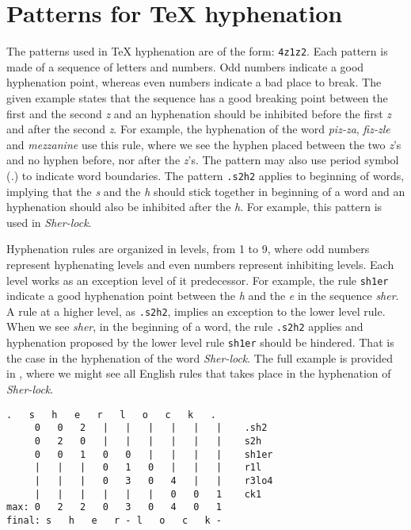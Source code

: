 \documentclass{article}
\begin{document}
\section{Patterns for \TeX{} hyphenation} 
The patterns used in \TeX{} hyphenation are of the form: \texttt{4z1z2}. Each
pattern is made of a sequence of letters and numbers. Odd numbers indicate a
good hyphenation point, whereas even numbers indicate a bad place to break.
The given example states that the sequence has a good breaking point between
the first and the second \emph{z} and an hyphenation should be inhibited before
the first \emph{z} and after the second \emph{z}. For example, the hyphenation
of the word \emph{piz-za}, \emph{fiz-zle} and \emph{mezzanine} use this rule,
where we see the hyphen placed between the two \emph{z}'s and no hyphen before,
nor after the \emph{z}'s. The pattern may also use period symbol (\emph{.}) to
indicate word boundaries. The pattern \texttt{.s2h2} applies to beginning of
words, implying that the \emph{s} and the \emph{h} should stick together in
beginning of a word and an hyphenation should also be inhibited after the
\emph{h}. For example, this pattern is used in \emph{Sher-lock}.

Hyphenation rules are organized in levels, from 1 to 9, where odd numbers
represent hyphenating levels and even numbers represent inhibiting levels. Each
level works as an exception level of it predecessor. For example, the rule
\texttt{sh1er} indicate a good hyphenation point between the \emph{h} and the
\emph{e} in the sequence \emph{sher}. A rule at a higher level, as
\texttt{.s2h2}, implies an exception to the lower level rule. When we see
\emph{sher}, in the beginning of a word, the rule \texttt{.s2h2} applies and
hyphenation proposed by the lower level rule \texttt{sh1er} should be hindered.
That is the case in the hyphenation of the word \emph{Sher-lock}. The full
example is provided in , where we might see all
English rules that takes place in the hyphenation of \emph{Sher-lock}.

\begin{lstlisting}[language={}, caption={Example of rules applyied in the
hyphenation of the word \emph{Sherlock}. Example done using a port of \TeX{}'s
hyphenation algorithm to Go provided at
\url{https://github.com/speedata/hyphenation}.}, label=sherlockhyphenation]
   .   s   h   e   r   l   o   c   k   .
     0   0   2   |   |   |   |   |   |    .sh2
     0   2   0   |   |   |   |   |   |    s2h
     0   0   1   0   0   |   |   |   |    sh1er
     |   |   |   0   1   0   |   |   |    r1l
     |   |   |   0   3   0   4   |   |    r3lo4
     |   |   |   |   |   |   0   0   1    ck1
max: 0   2   2   0   3   0   4   0   1
final: s   h   e   r - l   o   c   k -
\end{lstlisting}
\end{document}
